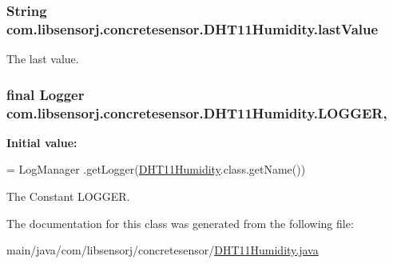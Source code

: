\subsubsection[{last\+Value}]{\setlength{\rightskip}{0pt plus 5cm}String com.\+libsensorj.\+concretesensor.\+D\+H\+T11\+Humidity.\+last\+Value\hspace{0.3cm}{\ttfamily [private]}}\label{classcom_1_1libsensorj_1_1concretesensor_1_1DHT11Humidity_a88a634746e0b70f8845fc8cddcab0cd9}
The last value. \hypertarget{classcom_1_1libsensorj_1_1concretesensor_1_1DHT11Humidity_a80655575ba16db014b7a1a797e030eae}{}
\subsubsection[{L\+O\+G\+G\+E\+R}]{\setlength{\rightskip}{0pt plus 5cm}final Logger com.\+libsensorj.\+concretesensor.\+D\+H\+T11\+Humidity.\+L\+O\+G\+G\+E\+R\hspace{0.3cm}{\ttfamily [static]}, {\ttfamily [private]}}\label{classcom_1_1libsensorj_1_1concretesensor_1_1DHT11Humidity_a80655575ba16db014b7a1a797e030eae}
{\bfseries Initial value\+:}
\begin{DoxyCode}
= LogManager
            .getLogger(\hyperlink{classcom_1_1libsensorj_1_1concretesensor_1_1DHT11Humidity_ad6a87900c7551436bfcc1dc319f16aea}{DHT11Humidity}.class.getName())
\end{DoxyCode}
The Constant L\+O\+G\+G\+E\+R. 

The documentation for this class was generated from the following file\+:\begin{DoxyCompactItemize}
\item 
main/java/com/libsensorj/concretesensor/\hyperlink{DHT11Humidity_8java}{D\+H\+T11\+Humidity.\+java}\end{DoxyCompactItemize}
